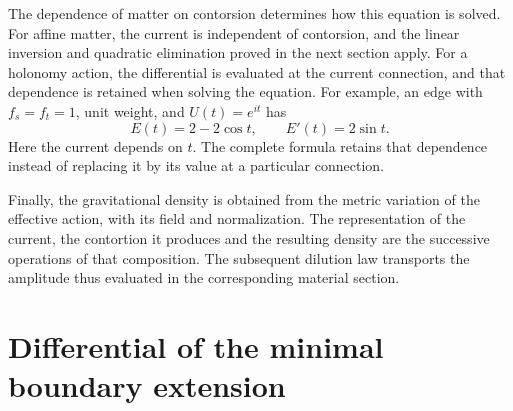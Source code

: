 The dependence of matter on contorsion determines how this equation is
solved. For affine matter, the current is independent of contorsion,
and the linear inversion and quadratic elimination proved in the next
section apply. For a holonomy action, the differential is evaluated at
the current connection, and that dependence is retained when solving
the equation. For example, an edge with
\(f_s=f_t=1\), unit weight, and \(U(t)=e^{it}\) has
\[
 E(t)=2-2\cos t,\qquad E'(t)=2\sin t.
\]
Here the current depends on \(t\). The complete formula retains
that dependence instead of replacing it by its value at a particular
connection.

Finally, the gravitational density is obtained from the metric
variation of the effective action, with its field and normalization.
The representation of the current, the contortion it produces and the
resulting density are the successive operations of that composition.
The subsequent dilution law transports the amplitude thus evaluated in
the corresponding material section.




\chapter{Differential of the minimal boundary extension}
\label{x_reciprocidad:vii:sec:corriente-extension-minima}

